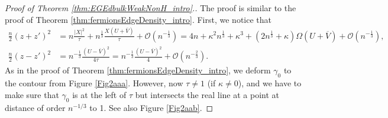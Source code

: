 \documentclass[%
 jmp,
cp,  %
 amsmath,amsthm,amssymb,%
 reprint,%
onecolumn]{revtex4-2}
\begin{document}
\begin{proof}[Proof of Theorem \ref{thm:EGEdbulkWeakNonH_intro}.]
The proof is similar to the 
proof of Theorem \ref{thm:fermionsEdgeDensity_intro}.
First, we notice that 
\begin{align*}
\frac{n}{2} (z+z')^2 &= n\frac{\lvert X\rvert^2}{\tau} + n^\frac{1}{3} \frac{X (U+\overline V)}{\tau} + \mathcal O(n^{-\frac{1}{3}})
= 4 n + \kappa^2 n^\frac{1}{3} + \kappa^3 + (2 n^\frac{1}{3} + \kappa) \Omega (U+\overline V) + \mathcal O(n^{-\frac{1}{3}}),\\
\frac{n}{2} (z-z')^2 &= n^{-\frac{1}{3}} \frac{(U-\overline V)^2}{4\tau} = n^{-\frac{1}{3}} \frac{(U-\overline V)^2}{4} + \mathcal O(n^{-\frac{2}{3}}). 
\end{align*}
As in the proof of Theorem \ref{thm:fermionsEdgeDensity_intro}, we deform $\gamma_0$ to the contour from Figure \ref{Fig2aaa}. However, now $ \tau\neq 1$ (if $\kappa \neq 0$), and we have to make sure that $\gamma_0$ is at the left of $\tau$ but intersects the real line at a point at distance of order $n^{-1/3}$ to 1. See also Figure \ref{Fig2aab}.


\end{proof}
\end{document}
